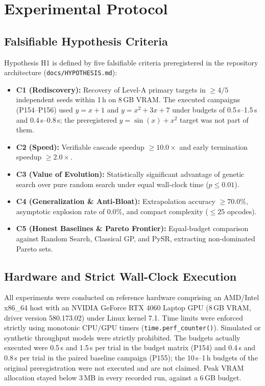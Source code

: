 \documentclass[11pt,a4paper]{article}
\begin{document}
\section{Experimental Protocol}

\subsection{Falsifiable Hypothesis Criteria}
Hypothesis H1 is defined by five falsifiable criteria preregistered in the repository architecture (\texttt{docs/HYPOTHESIS.md}):
\begin{itemize}
    \item \textbf{C1 (Rediscovery):} Recovery of Level-A primary targets in $\ge 4/5$ independent seeds within 1\,h on 8\,GB VRAM. The executed campaigns (P154--P156) used $y = x+1$ and $y = x^2+3x+7$ under budgets of 0.5\,s--1.5\,s and 0.4\,s--0.8\,s; the preregistered $y = \sin(x) + x^2$ target was not part of them.
    \item \textbf{C2 (Speed):} Verifiable cascade speedup $\ge 10.0\times$ and early termination speedup $\ge 2.0\times$.
    \item \textbf{C3 (Value of Evolution):} Statistically significant advantage of genetic search over pure random search under equal wall-clock time ($p \le 0.01$).
    \item \textbf{C4 (Generalization \& Anti-Bloat):} Extrapolation accuracy $\ge 70.0\%$, asymptotic explosion rate of $0.0\%$, and compact complexity ($\le 25$ opcodes).
    \item \textbf{C5 (Honest Baselines \& Pareto Frontier):} Equal-budget comparison against Random Search, Classical GP, and PySR, extracting non-dominated Pareto sets.
\end{itemize}

\subsection{Hardware and Strict Wall-Clock Execution}
All experiments were conducted on reference hardware comprising an AMD/Intel x86\_64 host with an NVIDIA GeForce RTX 4060 Laptop GPU (8\,GB VRAM, driver version 580.173.02) under Linux kernel 7.1. Time limits were enforced strictly using monotonic CPU/GPU timers (\texttt{time.perf\_counter()}). Simulated or synthetic throughput models were strictly prohibited. The budgets actually executed were 0.5\,s and 1.5\,s per trial in the budget matrix (P154) and 0.4\,s and 0.8\,s per trial in the paired baseline campaign (P155); the 10\,s--1\,h budgets of the original preregistration were not executed and are not claimed. Peak VRAM allocation stayed below 3\,MB in every recorded run, against a 6\,GB budget.
\end{document}
